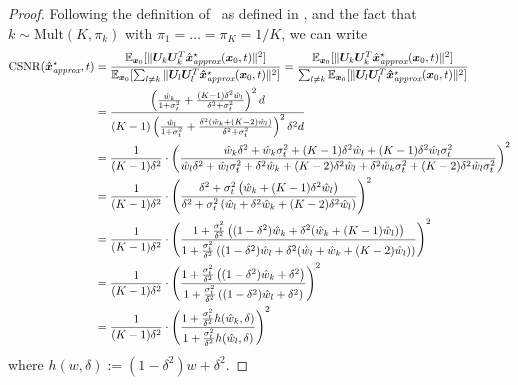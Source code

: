 \begin{proof}
    Following the definition of \CSNR~as defined in ,  and the fact that $k \sim \text{Mult}(K,\pi_k)$ with $\pi_1 = \dots = \pi_K = 1/K$, we can write
    \begin{align*}
        \mathrm{CSNR}(\hat{\bm x}_{\textit{approx}}^{\star},t) &= \frac{\operatorname{\mathbb{E}}_{\bm x_0}[\|\bm U_k\bm U_k^T \hat{\bm x}_{\textit{approx}}^{\star}(\bm x_0, t)\|^2]}{\operatorname{\mathbb{E}}_{\bm x_0}[\sum_{l\neq k}\|\bm U_l\bm U_l^T\bm \hat{\bm x}_{\textit{approx}}^{\star}(\bm x_0, t)\|^2]} = \frac{\operatorname{\mathbb{E}}_{\bm x_0}[\|\bm U_k\bm U_k^T \hat{\bm x}_{\textit{approx}}^{\star}(\bm x_0, t)\|^2]}{\sum_{l\neq k}\operatorname{\mathbb{E}}_{\bm x_0}[\|\bm U_l\bm U_l^T\bm \hat{\bm x}_{\textit{approx}}^{\star}(\bm x_0, t)\|^2]} \\
        &= \frac{\left( \frac{\hat{w}_k}{1 + \sigma_t^2} + \frac{(K-1)\delta^2\hat{w}_l}{\delta^2+\sigma_t^2}\right)^2 d}{(K-1)\left( \frac{\hat{w}_l}{1+\sigma_t^2} + \frac{\delta^2(\hat{w}_k + (K-2)\hat{w}_l)}{\delta^2 + \sigma_t^2} \right)^2 \delta^2 d} \\
        &= \frac{1}{(K-1)\delta^2} \cdot \left(\frac{\hat{w}_k\delta^2 + \hat{w}_k\sigma_t^2 + (K-1)\delta^2 \hat{w}_l + (K-1)\delta^2 \hat{w}_l\sigma_t^2}{\hat{w}_l\delta^2 + \hat{w}_l\sigma_t^2 + \delta^2 \hat{w}_k + (K-2)\delta^2\hat{w}_l + \delta^2 \hat{w}_k \sigma_t^2 + (K-2)\delta^2\hat{w}_l\sigma_t^2}\right)^2 \\
        &= \frac{1}{(K-1)\delta^2} \cdot \left(\frac{\delta^2 + \sigma_t^2 \left( \hat{w}_k + (K-1)\delta^2 \hat{w}_l \right) }{\delta^2 + \sigma_t^2 \left( \hat{w}_l + \delta^2\hat{w}_k + (K-2)\delta^2 \hat{w}_l \right) } \right)^2\\
        &= \frac{1}{(K-1)\delta^2} \cdot \left(\frac{1 + \frac{\sigma_t^2}{\delta^2}\left( (1 - \delta^2)\hat{w}_k + \delta^2 (\hat{w}_k + (K-1)\hat{w}_l) \right)}{1 + \frac{\sigma_t^2}{\delta^2}\left( (1-\delta^2)\hat{w}_l + \delta^2 (\hat{w}_l + \hat{w}_k + (K-2)\hat{w}_l) \right)}\right)^2 \\
        &= \frac{1}{(K-1)\delta^2} \cdot \left(\frac{1 + \frac{\sigma_t^2}{\delta^2}\left( (1 - \delta^2)\hat{w}_k + \delta^2\right)}{1 + \frac{\sigma_t^2}{\delta^2}\left( (1 - \delta^2)\hat{w}_l + \delta^2\right)}\right)^2 \\
        &= \frac{1}{(K-1)\delta^2} \cdot \left(\frac{1 + \frac{\sigma_t^2}{\delta^2}h(\hat{w}_k, \delta)}{1 + \frac{\sigma_t^2}{\delta^2}h(\hat{w}_l, \delta)}\right)^2 \\
    \end{align*}
    where $h(w, \delta) := (1 - \delta^2)w + \delta^2$.
\end{proof}

